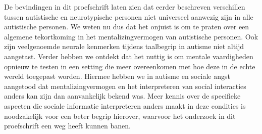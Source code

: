 De bevindingen in dit proefschrift laten zien dat eerder beschreven verschillen tussen autistische en neurotypische personen niet universeel aanwezig zijn in alle autistische personen. We weten nu dus dat het onjuist is om te praten over een algemene tekortkoming in het mentalizingvermogen van autistische personen. Ook zijn veelgenoemde neurale kenmerken tijdens taalbegrip in autisme niet altijd aangetast. Verder hebben we ontdekt dat het nuttig is om mentale vaardigheden opnieuw te testen in een setting die meer overeenkomen met hoe deze in de echte wereld toegepast worden. Hiermee hebben we in autisme en sociale angst aangetood dat mentalizingvermogen en het interpreteren van social interacties anders kan zijn dan aanvankelijk bekend was. Meer kennis over de specifieke aspecten die sociale informatie interpreteren anders maakt in deze condities is noodzakelijk voor een beter begrip hierover, waarvoor het onderzoek in dit proefschrift een weg heeft kunnen banen.
